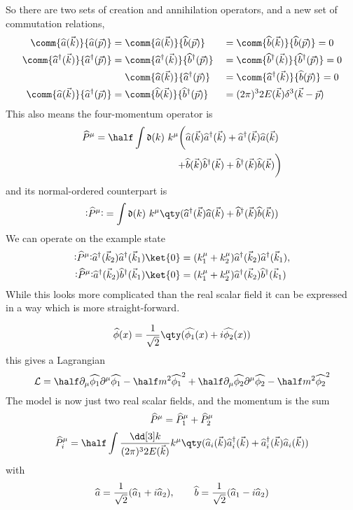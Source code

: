 So there are two sets of creation and annihilation operators, and a
new set of commutation relations,
\[
\begin{aligned}
  \comm{\Op{a}(\vec{k})}{\Op{a}(\vec{p})} & = \comm{\Op{a}(\vec{k})}{\Op{b}(\vec{p})}    && = \comm{\Op{b}(\vec{k})}{\Op{b}(\vec{p})}    = 0 \\
\comm{\hOp{a}(\vec{k})}{\hOp{a}(\vec{p})} & = \comm{\hOp{a}(\vec{k})}{\hOp{b}(\vec{p})}  && = \comm{\hOp{b}(\vec{k})}{\hOp{b}(\vec{p})}   =0 \\
& \quad\ \comm{\Op{a}(\vec{k})}{\hOp{a}(\vec{p})}  && = \comm{\hOp{a}(\vec{k})}{\Op{b}(\vec{p})}   = 0 \\
 \comm{\Op{a}(\vec{k})}{\hOp{a}(\vec{p})} &= \comm{\Op{b}(\vec{k})}{\hOp{b}(\vec{p})} && = (2 \pi)^3 2 E(\vec{k}) \delta^3(\vec{k}-\vec{p})
\end{aligned}
\]
This also means the four-momentum operator is
\begin{align}
  \label{eq:43}
  \Op{P}^{\mu} = \half \int \nm{k} k^{\mu} \bigg( &\Op{a}(\vec{k}) \hOp{a}(\vec{k}) + \hOp{a}(\vec{k}) \Op{a}(\vec{k}) \nonumber \\+& \Op{b}(\vec{k}) \hOp{b} (\vec{k}) + \hOp{b}(\vec{k}) \Op{b}(\vec{k}) \bigg)
\end{align}
and its normal-ordered counterpart is
\begin{equation}
  \label{eq:44}
  \normbracket{\Op{P}^{\mu}} = \int \nm{k} k^{\mu} \qty( \hOp{a}(\vec{k}) \Op{a}(\vec{k}) + \hOp{b}(\vec{k}) \Op{b}(\vec{k}) )
\end{equation}
We can operate on the example state
\begin{align*} 
\normbracket{\Op{P}^{\mu}} \hOp{a}(\vec{k}_2)\hOp{a}(\vec{k}_1) \ket{0} &= ( k_1^{\mu} + k_2^{\mu} ) \hOp{a}(\vec{k}_2) \hOp{a}(\vec{k}_1),  
 \\
\normbracket{\Op{P}^{\mu}} \hOp{a}(\vec{k}_2)\hOp{b}(\vec{k}_1) \ket{0} &= ( k_1^{\mu} + k_2^{\mu} ) \hOp{a}(\vec{k}_2) \hOp{b}(\vec{k}_1) 
\end{align*}
While this looks more complicated than the real scalar field it can be
expressed in a way which is more straight-forward.

\begin{equation}
  \label{eq:11}
  \Op{\phi}(x) = \frac{1}{\sqrt{2}} \qty( \Op{\phi_1}(x) + i \Op{\phi_2}(x) )
\end{equation}
this gives a Lagrangian
\[
  \Lag = \half \partial_{\mu} \Op{\phi_1} \partial^{\mu} \Op{\phi_1} 
- \half m^2 \Op{ \phi_1 }^2  + \half \partial_{\mu} \Op{\phi_2} \partial^{\mu} \Op{\phi_2}
- \half m^2 \Op{ \phi_2 }^2
\]
The model is now just two real scalar fields, and the momentum is the sum
\[ {\widehat{P}}^{\mu} = {\widehat{P}}_1^{\mu} + {\widehat{P}}^{\mu}_2 \]
\[ \Op{P}^{\mu}_i = \half \int \normmeasure{k} k^{\mu} \qty( \Op{a}_i(\vec{k}) \hOp{a}_i(\vec{k}) + \hOp{a}_i(\vec{k}) \Op{a}_i(\vec{k})  ) \]
with
\[ {\widehat{a}} = \frac{1}{\sqrt{2}} ({\widehat{a}}_1 + i {\widehat{a}}_2), \qquad {\widehat{b}} = \frac{1}{\sqrt{2}} ({\widehat{a}}_1 - i {\widehat{a}}_2) \]

